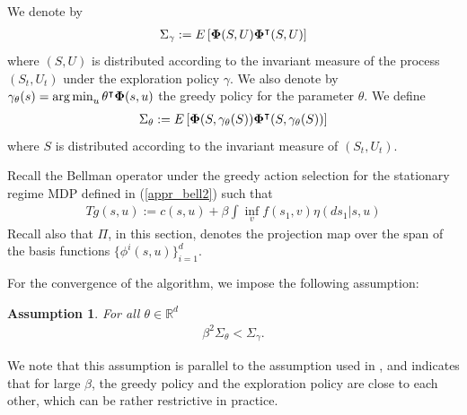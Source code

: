 \documentclass[11pt]{article}
\newtheorem{assumption}{Assumption}
\def\argmin{\mathop{\rm arg\, min}}
\begin{document}
We denote by
\begin{align}\label{sigma_gamma}
\Sigma_\gamma:=E\left[{\bf \Phi}(S,U){\bf \Phi}^\intercal(S,U)\right]
\end{align}
where $(S,U)$ is distributed according  to the invariant measure of the process $(S_t,U_t)$ under the exploration policy $\gamma$. We also denote by $\gamma_\theta(s)=\argmin_u \theta^\intercal {\bf \Phi}(s,u) $ the greedy policy for the parameter $\theta$. We define
\begin{align}\label{sigma_star}
\Sigma_\theta:=E\left[{\bf \Phi}(S,\gamma_\theta(S)){\bf \Phi}^\intercal(S,\gamma_\theta(S))\right]
\end{align}
where $S$ is distributed according to the invariant measure of $(S_t,U_t)$.

Recall the Bellman operator under the greedy action selection for the stationary regime MDP defined in (\ref{appr_bell2}) such that 
\begin{align*}
T g(s,u) := {c}(s,u) + \beta \int \inf_vf(s_1,v)\eta(ds_1|s,u)
\end{align*}
Recall also that $\Pi$, in this section, denotes the projection map over the span of the basis functions $\{\phi^i(s,u)\}_{i=1}^d$.

For the convergence of the algorithm, we impose the following assumption:
\begin{assumption}\label{rest_assmp}
For all $\theta\in\mathds{R}^d$
\begin{align*}
 \beta^2 \Sigma_\theta< \Sigma_\gamma.
\end{align*}
\end{assumption}
We note that this assumption is parallel to the assumption used in \cite{melo2008analysis}, and indicates that for large $\beta$, the greedy policy and the exploration policy are close to each other, which can be rather restrictive in practice.
\end{document}
